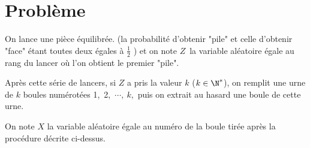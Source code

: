 \documentclass[11pt]{article}%
\begin{document}
\section*{Problème}

On lance une pièce équilibrée. (la probabilité d'obtenir
"pile" et celle d'obtenir "face" étant toutes deux égales à
$\frac{1}{2}$ ) et on note $Z$\ la variable aléatoire égale au rang
du lancer où l'on obtient le premier "pile".

Après cette série de lancers, si $Z$ a pris la valeur $k$ ($k\in 
\N^{\ast }$), on remplit une urne de $k$ boules numérotées
1,\ 2,\ $\cdots,\ k,$ puis on extrait au hasard une boule de cette
urne.

On note $X$ la variable aléatoire égale au numéro de la boule tirée
après la procédure décrite ci-dessus.
\end{document}
